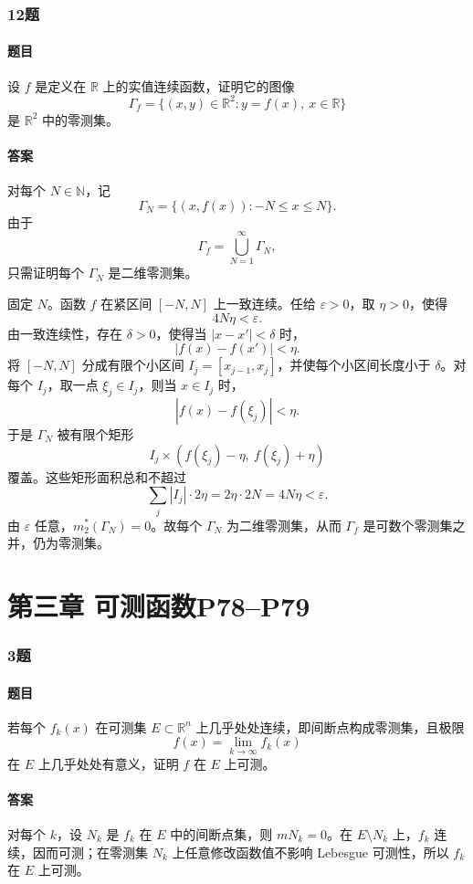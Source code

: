 \documentclass{article}
\newcommand{\eps}{\varepsilon}
\begin{document}
\subsubsection*{12题}
\paragraph{题目} 设 $f$ 是定义在 $\mathbb{R}$ 上的实值连续函数，证明它的图像
\[
 \Gamma_f=\{(x,y)\in\mathbb{R}^2:y=f(x),\ x\in\mathbb{R}\}
\]
是 $\mathbb{R}^2$ 中的零测集。

\paragraph{答案} 对每个 $N\in\mathbb{N}$，记
\[
 \Gamma_N=\{(x,f(x)):-N\le x\le N\}.
\]
由于
\[
 \Gamma_f=\bigcup_{N=1}^{\infty}\Gamma_N,
\]
只需证明每个 $\Gamma_N$ 是二维零测集。

固定 $N$。函数 $f$ 在紧区间 $[-N,N]$ 上一致连续。任给 $\eps>0$，取 $\eta>0$，使得
\[
 4N\eta<\eps.
\]
由一致连续性，存在 $\delta>0$，使得当 $|x-x'|<\delta$ 时，
\[
 |f(x)-f(x')|<\eta.
\]
将 $[-N,N]$ 分成有限个小区间 $I_j=[x_{j-1},x_j]$，并使每个小区间长度小于 $\delta$。对每个 $I_j$，取一点 $\xi_j\in I_j$，则当 $x\in I_j$ 时，
\[
 |f(x)-f(\xi_j)|<\eta.
\]
于是 $\Gamma_N$ 被有限个矩形
\[
 I_j\times(f(\xi_j)-\eta,\ f(\xi_j)+\eta)
\]
覆盖。这些矩形面积总和不超过
\[
 \sum_j |I_j|\cdot 2\eta=2\eta\cdot 2N=4N\eta<\eps.
\]
由 $\eps$ 任意，$m_2^*(\Gamma_N)=0$。故每个 $\Gamma_N$ 为二维零测集，从而 $\Gamma_f$ 是可数个零测集之并，仍为零测集。

\section*{第三章 \quad 可测函数\quad P78--P79}

\subsubsection*{3题}
\paragraph{题目} 若每个 $f_k(x)$ 在可测集 $E\subset\mathbb{R}^n$ 上几乎处处连续，即间断点构成零测集，且极限
\[
 f(x)=\lim_{k\to\infty}f_k(x)
\]
在 $E$ 上几乎处处有意义，证明 $f$ 在 $E$ 上可测。

\paragraph{答案} 对每个 $k$，设 $N_k$ 是 $f_k$ 在 $E$ 中的间断点集，则 $mN_k=0$。在 $E\setminus N_k$ 上，$f_k$ 连续，因而可测；在零测集 $N_k$ 上任意修改函数值不影响 Lebesgue 可测性，所以 $f_k$ 在 $E$ 上可测。
\end{document}
